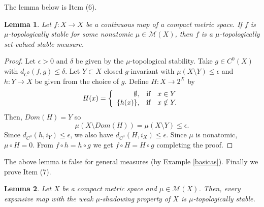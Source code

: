 \documentclass[11pt,letterpaper]{amsart}
\theoremstyle{plain}
\newtheorem{lemma}{Lemma}
\begin{document}
The lemma below is Item (6).



\begin{lemma}
\label{pai}
Let $f:X\to X$ be a continuous map of a compact metric space.
If $f$ is $\mu$-topologically stable for some nonatomic $\mu\in\mathcal{M}(X)$, then $f$ is a $\mu$-topologically set-valued stable measure.
\end{lemma}

\begin{proof}
Let $\epsilon>0$ and $\delta$ be given by the $\mu$-topological stability.
Take $g\in C^0(X)$ with $d_{C^0}(f,g)\leq\delta$.
Let $Y\subset X$ closed $g$-invariant with $\mu(X\setminus Y)\leq\epsilon$ and $h:Y\to X$ be given from the choice of $g$.
Define $H:X\to 2^X$ by
$$
H(x) = \left\{
\begin{array}{rll}
\emptyset,   & \hbox{if} & x \in Y \\
\{h(x)\},  & \hbox{if} & x \notin Y.
\end{array}
\right.
$$
Then, $Dom(H)=Y$ so
$$
\mu(X\setminus Dom(H))=\mu(X\setminus Y)\leq\epsilon.
$$
Since $d_{C^0}(h,i_Y)\leq\epsilon$, we also have
$d_{C^0}(H,i_X)\leq\epsilon$.
Since $\mu$ is nonatomic, $\mu\circ H=0$.
From $f\circ h=h\circ g$ we get $f\circ H=H\circ g$ completing the proof.
\end{proof}

The above lemma is false for general measures (by Example \ref{basicas}).
Finally we prove Item (7).






\begin{lemma}
\label{wally}
Let $X$ be a compact metric space and $\mu\in \mathcal{M}(X)$. Then, every expansive map with the weak $\mu$-shadowing property of $X$ is
$\mu$-topologically stable.
\end{lemma}
\end{document}
